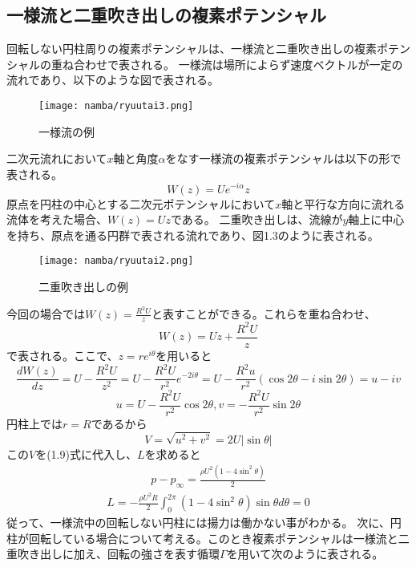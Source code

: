 \documentclass[10pt,b5paper,papersize,dvipdfmx]{jsbook}
\begin{document}
\subsection{一様流と二重吹き出しの複素ポテンシャル}
回転しない円柱周りの複素ポテンシャルは、一様流と二重吹き出しの複素ポテンシャルの重ね合わせで表される。
一様流は場所によらず速度ベクトルが一定の流れであり、以下のような図で表される。
\begin{figure}[ht]
  \centering
  \texttt{[image: namba/ryuutai3.png]}
  \caption{一様流の例}
\end{figure}
\par
二次元流れにおいて$x$軸と角度$\alpha$をなす一様流の複素ポテンシャルは以下の形で表される。
\begin{equation}
  W(z)=Ue^{-i\alpha}z
\end{equation}
原点を円柱の中心とする二次元ポテンシャルにおいて$x$軸と平行な方向に流れる流体を考えた場合、$W(z)=Uz$である。
二重吹き出しは、流線が$y$軸上に中心を持ち、原点を通る円群で表される流れであり、図1.3のように表される。
\begin{figure}[ht]
  \centering
  \texttt{[image: namba/ryuutai2.png]}
  \caption{二重吹き出しの例}
\end{figure}
今回の場合では$W(z)=\frac{R^2U}{z}$と表すことができる。これらを重ね合わせ、
\begin{equation}
  W(z)=Uz+\frac{R^2U}{z}
\end{equation}
で表される。ここで、$z=re^{i\theta}$を用いると
\begin{equation}
  \frac{dW(z)}{dz}=U-\frac{R^2U}{z^2}=U-\frac{R^2U}{r^2}e^{-2i\theta}=U-\frac{R^2u}{r^2}(\cos2\theta-i\sin2\theta)=u-iv
\end{equation}
\begin{equation}
　u=U-\frac{R^2U}{r^2}\cos2\theta, v=-\frac{R^2U}{r^2}\sin2\theta
\end{equation}
円柱上では$r=R$であるから
\begin{equation}
  V=\sqrt{u^2+v^2}=2U|\sin\theta|
\end{equation}
この$V$を(1.9)式に代入し、$L$を求めると
\begin{align}
  p - p_\infty = \frac{\rho U^2(1 - 4\sin ^2\theta)}{2}
\end{align}
\begin{align}
  L = -\frac{\rho U^2R}{2} \int_0^{2\pi} (1-4\sin ^2\theta)\sin\theta d\theta 
    = 0
\end{align}
従って、一様流中の回転しない円柱には揚力は働かない事がわかる。
次に、円柱が回転している場合について考える。このとき複素ポテンシャルは一様流と二重吹き出しに加え、回転の強さを表す循環$\Gamma$を用いて次のように表される。
\end{document}
